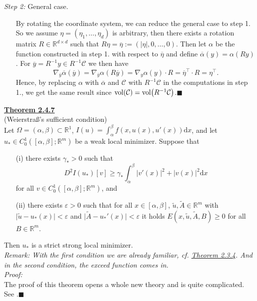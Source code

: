 \textit{Step 2:} General case.
\begin{itemize}
	\item[] By rotating the coordinate system, we can reduce the general case to step 1. So we assume $\eta=(\eta_1,\dotsc,\eta_d)$ is arbitrary, then there exists a rotation matrix $R\in\mathbb{R}^{d\times d}$ such that $R\eta=\overline{\eta}:=(\lvert\eta\rvert,0,\dotsc,0)$. Then let $\alpha$ be the function constructed in step 1. with respect to $\overline{\eta}$ and define $\overline{\alpha}(y)=\alpha(Ry)$. For $\overline{y}=R^{-1}y\in R^{-1}\mathcal{C}$ we then have
	\[\nabla_{\overline{y}}\overline{\alpha}(\overline{y})=\nabla_{\overline{y}}\alpha(R\overline{y})=\nabla_y\alpha(y)\cdot R=\overline{\eta}^\top\cdot R=\eta^\top.\]
	Hence, by replacing $\alpha$ with $\overline{\alpha}$ and $\mathcal{C}$ with $R^{-1}\mathcal{C}$ in the computations in step 1., we get the same result since $\operatorname{vol}\mathopen{}\left(\mathcal{C}\right)\mathclose{}=\operatorname{vol}\mathopen{}\left(R^{-1}\mathcal{C}\right)\mathclose{}$.\hfill$\blacksquare$\\[11pt]
\end{itemize}

\textbf{\underline{Theorem 2.4.7}}\\
(Weierstra{\ss}'s sufficient condition)\\
Let $\Omega=(\alpha,\beta)\subset\mathbb{R}^1$, $I(u)=\int_\alpha^\beta{f(x,u(x),u'(x))\mathrm{d}x}$, and let $u_*\in C_0^1([\alpha,\beta];\mathbb{R}^m)$ be a weak local minimizer. Suppose that
\begin{itemize}
	\item[(i)] there exists $\gamma_*>0$ such that
	\[D^2I(u_*)[v]\geq\gamma_*\int_\alpha^\beta{\lvert v'(x)\rvert^2+\lvert v(x)\rvert^2\mathrm{d}x}\]
	for all $v\in C_0^1([\alpha,\beta];\mathbb{R}^m)$, and
	\item[(ii)] there exists $\varepsilon>0$ such that for all $x\in[\alpha,\beta]$, $\tilde{u},\tilde{A}\in\mathbb{R}^m$ with $\lvert\tilde{u}-u_*(x)\rvert<\varepsilon$ and $\lvert\tilde{A}-u_*'(x)\rvert<\varepsilon$ it holds $E(x,\tilde{u},\tilde{A},B)\geq0$ for all $B\in\mathbb{R}^m$.
\end{itemize}
Then $u_*$ is a strict strong local minimizer.\\

\textit{Remark: With the first condition we are already familiar, cf. \hyperlink{theorem_2_3_4}{Theorem 2.3.4}. And in the second condition, the exceed function comes in.}\\

\textit{Proof:}\\
The proof of this theorem opens a whole new theory and is quite complicated. See \cite[Chapter ?, Section ? Theorem ?]{magnus_r_hestenes}.\hfill$\blacksquare$\\[11pt]

